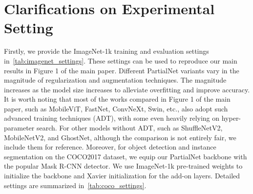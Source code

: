 \section{Clarifications on Experimental Setting}
Firstly, we provide the ImageNet-1k training and evaluation settings in~\cref{tab:imagenet_settings}. These settings can be used to reproduce our main results in Figure 1 of the main paper. Different PartialNet variants vary in the magnitude of regularization and augmentation techniques. The magnitude increases as the model size increases to alleviate overfitting and improve accuracy. It is worth noting that most of the works compared in Figure 1 of the main paper, such as MobileViT, FastNet, ConvNeXt, Swin, etc., also adopt such advanced training techniques (ADT), with some even heavily relying on hyper-parameter search. For other models without ADT, such as ShuffleNetV2, MobileNetV2, and GhostNet, although the comparison is not entirely fair, we include them for reference. Moreover, for object detection and instance segmentation on the COCO2017 dataset, we equip our PartialNet backbone with the popular Mask R-CNN detector. We use ImageNet-1k pre-trained weights to initialize the backbone and Xavier initialization for the add-on layers. Detailed settings are summarized in~\cref{tab:coco_settings}.


